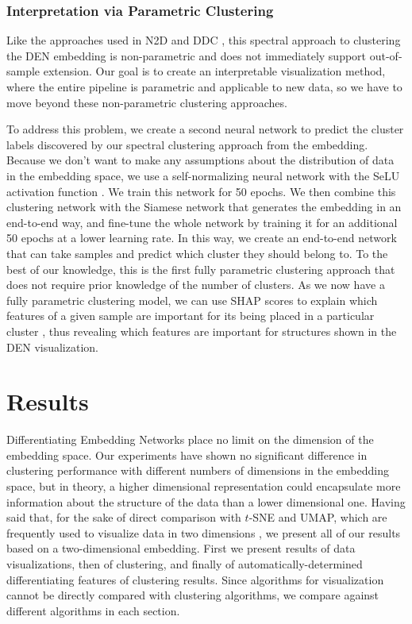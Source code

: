 \documentclass{article}
\begin{document}
\subsubsection{Interpretation via Parametric Clustering}

Like the approaches used in N2D \cite{mcconville2019n2d} and DDC \cite{ren2020deep}, this spectral approach to clustering the DEN embedding is non-parametric and does not immediately support out-of-sample extension. Our goal is to create an interpretable visualization method, where the entire pipeline is parametric and applicable to new data, so we have to move beyond these non-parametric clustering approaches.

To address this problem, we create a second neural network to predict the cluster labels discovered by our spectral clustering approach from the embedding. Because we don't want to make any assumptions about the distribution of data in the embedding space, we use a self-normalizing neural network with the SeLU activation function \cite{klambauer2017self}. We train this network for 50 epochs. We then combine this clustering network with the Siamese network that generates the embedding in an end-to-end way, and fine-tune the whole network by training it for an additional 50 epochs at a lower learning rate. In this way, we create an end-to-end network that can take samples and predict which cluster they should belong to. To the best of our knowledge, this is the first fully parametric clustering approach that does not require prior knowledge of the number of clusters. As we now have a fully parametric clustering model, we can use SHAP scores to explain which features of a given sample are important for its being placed in a particular cluster \cite{NIPS2017_7062}, thus revealing which features are important for structures shown in the DEN visualization.

\section{Results}

Differentiating Embedding Networks place no limit on the dimension of the embedding space. Our experiments have shown no significant difference in clustering performance with different numbers of dimensions in the embedding space, but in theory, a higher dimensional representation could encapsulate more information about the structure of the data than a lower dimensional one. Having said that, for the sake of direct comparison with $t$-SNE and UMAP, which are frequently used to visualize data in two dimensions \cite{maaten2008visualizing, 2018arXivUMAP}, we present all of our results based on a two-dimensional embedding. First we present results of data visualizations, then of clustering, and finally of automatically-determined differentiating features of clustering results. Since algorithms for visualization cannot be directly compared with clustering algorithms, we compare against different algorithms in each section.
\end{document}
